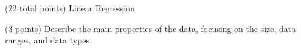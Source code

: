 \documentclass[12pt]{article}
\begin{document}
\maketitle
\thispagestyle{empty}







\clearpage

\begin{question}{(22 total points) Linear Regression}




%
%
\begin{subquestion}{(3 points) Describe the main properties of the data, focusing on the size, data ranges, and data types.   
}



\end{subquestion}
\end{question}
\end{document}
